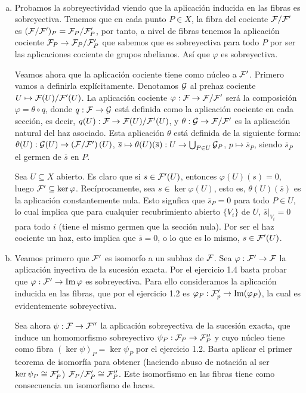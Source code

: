 \documentclass[twoside]{article}
\begin{document}
\begin{solucion}\
\begin{enumerate}[(a)]
\item Probamos la sobreyectividad viendo que la aplicación inducida en las fibras es sobreyectiva. Tenemos que en cada punto $P\in X$, la fibra del cociente $\mathcal{F}/\mathcal{F}'$ es $(\mathcal{F}/\mathcal{F}')_P=\mathcal{F}_P/\mathcal{F}'_P$, por tanto, a nivel de fibras tenemos la aplicación cociente $\mathcal{F}_P\to \mathcal{F}_P/\mathcal{F}'_P$ que sabemos que es sobreyectiva para todo $P$ por ser las aplicaciones cociente de grupos abelianos. Así que $\varphi$ es sobreyectiva.

Veamos ahora que la aplicación cociente tiene como núcleo a $\mathcal{F}'$. Primero vamos a definirla explícitamente. Denotamos $\mathcal{G}$ al prehaz cociente $U\mapsto \mathcal{F}(U)/\mathcal{F}'(U)$. La aplicación cociente $\varphi:\mathcal{F}\to\mathcal{F}/\mathcal{F}'$ será la composición $\varphi=\theta\circ q$, donde $q:\mathcal{F}\to \mathcal{G}$ está definida como la aplicación cociente en cada sección, es decir, $q(U): \mathcal{F}\to \mathcal{F}(U)/\mathcal{F}'(U)$, y $\theta:\mathcal{G}\to\mathcal{F}/\mathcal{F}'$ es la aplicación natural del haz asociado. Esta aplicación $\theta$ está definida de la siguiente forma: $\theta(U):\mathcal{G}(U)\to\left(\mathcal{F}/\mathcal{F}'\right)(U)$, $\overline{s}\mapsto\theta(U)(\overline{s}):U\to\bigcup_{P\in U} \mathcal{G}_P$, $p\mapsto\overline{s}_P$, siendo $\overline{s}_P$ el germen de $\overline{s}$ en $P$.

Sea $U\subseteq X$ abierto. Es claro que si $s\in\mathcal{F}'(U)$, entonces $\varphi(U)(s)=0$, luego $\mathcal{F}'\subseteq\ker\varphi$. Recíprocamente, sea $s\in \ker\varphi(U)$, esto es, $\theta(U)(\overline{s})$ es la aplicación constantemente nula. Esto signfica que $\overline{s}_P=0$ para todo $P\in U$, lo cual implica que para cualquier recubrimiento abierto $\{V_i\}$ de $U$, $\overline{s}|_{V_i}=0$ para todo $i$ (tiene el mismo germen que la sección nula). Por ser el haz cociente un haz, esto implica que $\overline{s}=0$, o lo que es lo mismo, $s\in \mathcal{F}'(U)$. 


\item Veamos primero que $\mathcal{F}'$ es isomorfo a un subhaz de $\mathcal{F}$. Sea $\varphi:\mathcal{F}'\to\mathcal{F}$ la aplicación inyectiva de la sucesión exacta. Por el ejercicio 1.4 basta probar que $\varphi:\mathcal{F}'\to\operatorname{Im}\varphi$ es sobreyectiva. Para ello consideramos la aplicación inducida en las fibras, que por el ejercicio 1.2 es $\varphi_P:\mathcal{F}'_p\to\operatorname{Im}(\varphi_P)$, la cual es evidentemente sobreyectiva. 

Sea ahora $\psi:\mathcal{F}\to\mathcal{F}''$ la aplicación sobreyectiva de la sucesión exacta, que induce un homomorfismo sobreyectivo $\psi_P:\mathcal{F}_P\to\mathcal{F}''_P$ y cuyo núcleo tiene como fibra $(\ker\psi)_P=\ker\psi_P$ por el ejercicio 1.2. Basta aplicar el primer teorema de isomorfía para obtener (haciendo abuso de notación al ser $\ker\psi_P\cong\mathcal{F}'_P$) $\mathcal{F}_P/\mathcal{F}'_P \cong \mathcal{F}''_P$. Este isomorfismo en las fibras tiene como consecuencia un isomorfismo de haces. 
\end{enumerate}
\end{solucion}
\end{document}
